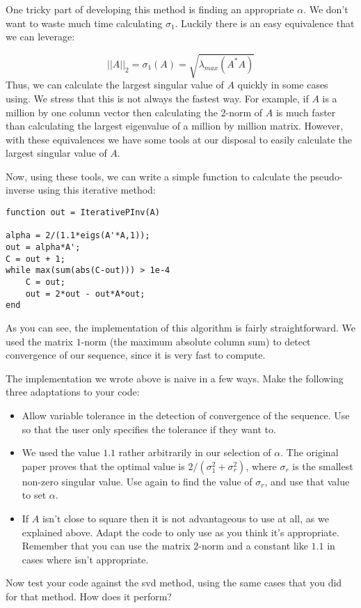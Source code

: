 One tricky part of developing this method is finding an appropriate $\alpha$. We don't want to waste much time calculating $\sigma_1$. Luckily there is an easy equivalence that we can leverage:

\[
||A||_2 = \sigma_1(A) = \sqrt{\lambda_{max} (A^* A)}
\]
Thus, we can calculate the largest singular value of $A$ quickly in some cases using. We stress that this is not always the fastest way. For example, if $A$ is a million by one column vector then calculating the 2-norm of $A$ is much faster than calculating the largest eigenvalue of a million by million matrix. However, with these equivalences we have some tools at our disposal to easily calculate the largest singular value of $A$.

Now, using these tools, we can write a simple function to calculate the pseudo-inverse using this iterative method:

\begin{lstlisting}
function out = IterativePInv(A)

alpha = 2/(1.1*eigs(A'*A,1));
out = alpha*A';
C = out + 1;
while max(sum(abs(C-out))) > 1e-4
    C = out;
    out = 2*out - out*A*out;
end
\end{lstlisting}
As you can see, the implementation of this algorithm is fairly straightforward. We used the matrix $1$-norm (the maximum absolute column sum) to detect convergence of our sequence, since it is very fast to compute.

\begin{problem}
The implementation we wrote above is naive in a few ways. Make the following three adaptations to your code:
\begin{itemize}
\item Allow variable tolerance in the detection of convergence of the sequence. Use  so that the user only specifies the tolerance if they want to.
\item We used the value $1.1$ rather arbitrarily in our selection of $\alpha$. The original paper proves that the optimal value is $2/(\sigma_1^2 + \sigma_r^2)$, where $\sigma_r$ is the smallest non-zero singular value. Use again to find the value of $\sigma_r$, and use that value to set $\alpha$.
\item If $A$ isn't close to square then it is not advantageous to use at all, as we explained above. Adapt the code to only use  as you think it's appropriate. Remember that you can use the matrix $2$-norm and a constant like $1.1$ in cases where  isn't appropriate.
\end{itemize}

Now test your code against the svd method, using the same cases that you did for that method. How does it perform?
\end{problem}

